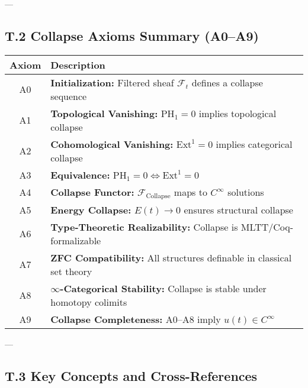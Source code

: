 \documentclass[11pt]{article}
\begin{document}
{---

\subsection*{T.2 Collapse Axioms Summary (A0–A9)}

\begin{center}
\begin{tabular}{|c|p{10cm}|}
\hline
\textbf{Axiom} & \textbf{Description} \\
\hline
A0 & \textbf{Initialization:} Filtered sheaf $\mathcal{F}_t$ defines a collapse sequence \\
A1 & \textbf{Topological Vanishing:} $\mathrm{PH}_1 = 0$ implies topological collapse \\
A2 & \textbf{Cohomological Vanishing:} $\mathrm{Ext}^1 = 0$ implies categorical collapse \\
A3 & \textbf{Equivalence:} $\mathrm{PH}_1 = 0 \Leftrightarrow \mathrm{Ext}^1 = 0$ \\
A4 & \textbf{Collapse Functor:} $\mathcal{F}_{\mathrm{Collapse}}$ maps to $C^\infty$ solutions \\
A5 & \textbf{Energy Collapse:} $E(t) \to 0$ ensures structural collapse \\
A6 & \textbf{Type-Theoretic Realizability:} Collapse is MLTT/Coq-formalizable \\
A7 & \textbf{ZFC Compatibility:} All structures definable in classical set theory \\
A8 & \textbf{$\infty$-Categorical Stability:} Collapse is stable under homotopy colimits \\
A9 & \textbf{Collapse Completeness:} A0–A8 imply $u(t) \in C^\infty$ \\
\hline
\end{tabular}
\end{center}

---

\subsection*{T.3 Key Concepts and Cross-References}

}
\end{document}
